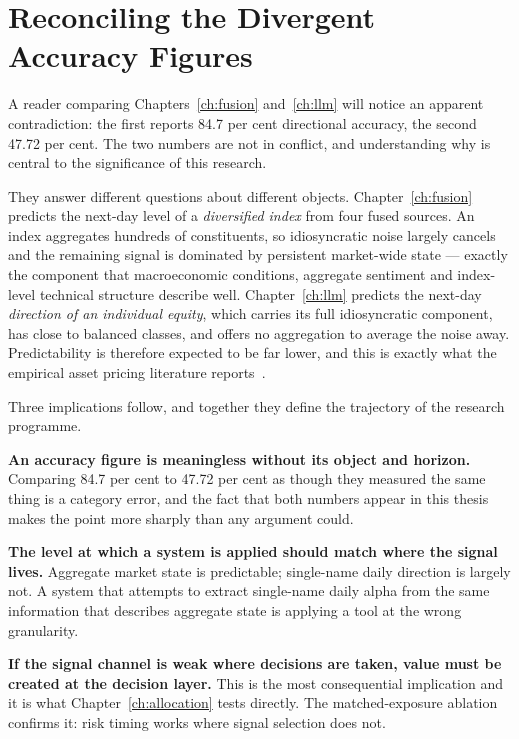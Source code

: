 \section{Reconciling the Divergent Accuracy Figures}
\label{sec:reconcile}

A reader comparing Chapters~\ref{ch:fusion} and~\ref{ch:llm} will notice an apparent contradiction:
the first reports 84.7 per cent directional accuracy, the second 47.72 per cent. The two numbers
are not in conflict, and understanding why is central to the significance of this research.

They answer different questions about different objects. Chapter~\ref{ch:fusion} predicts the
next-day level of a \emph{diversified index} from four fused sources. An index aggregates hundreds
of constituents, so idiosyncratic noise largely cancels and the remaining signal is dominated by
persistent market-wide state --- exactly the component that macroeconomic conditions, aggregate
sentiment and index-level technical structure describe well. Chapter~\ref{ch:llm} predicts the
next-day \emph{direction of an individual equity}, which carries its full idiosyncratic component,
has close to balanced classes, and offers no aggregation to average the noise away. Predictability
is therefore expected to be far lower, and this is exactly what the empirical asset pricing
literature reports~\cite{gu2020,fama1970}.

Three implications follow, and together they define the trajectory of the research programme.

\textbf{An accuracy figure is meaningless without its object and horizon.} Comparing 84.7 per cent
to 47.72 per cent as though they measured the same thing is a category error, and the fact that
both numbers appear in this thesis makes the point more sharply than any argument could.

\textbf{The level at which a system is applied should match where the signal lives.} Aggregate
market state is predictable; single-name daily direction is largely not. A system that attempts to
extract single-name daily alpha from the same information that describes aggregate state is
applying a tool at the wrong granularity.

\textbf{If the signal channel is weak where decisions are taken, value must be created at the
decision layer.} This is the most consequential implication and it is what Chapter~\ref{ch:allocation}
tests directly. The matched-exposure ablation confirms it: risk timing works where signal
selection does not.


